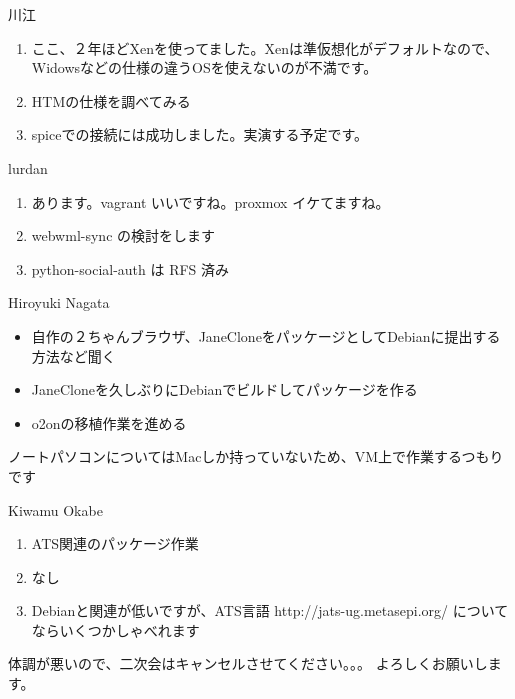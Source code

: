 \documentclass[mingoth,a4paper]{jsarticle}
\begin{document}
\begin{prework}{ 川江 }

 \begin{enumerate}
  \item ここ、２年ほどXenを使ってました。Xenは準仮想化がデフォルトなので、Widowsなどの仕様の違うOSを使えないのが不満です。
  \item HTMの仕様を調べてみる
  \item spiceでの接続には成功しました。実演する予定です。
 \end{enumerate}

\end{prework}

\begin{prework}{ lurdan }

 \begin{enumerate}
  \item あります。vagrant いいですね。proxmox イケてますね。
  \item webwml-sync の検討をします
  \item python-social-auth は RFS 済み
 \end{enumerate}

\end{prework}

\begin{prework}{ Hiroyuki Nagata }

 \begin{itemize}
  \item 自作の２ちゃんブラウザ、JaneCloneをパッケージとしてDebianに提出する方法など聞く
  \item JaneCloneを久しぶりにDebianでビルドしてパッケージを作る
  \item o2onの移植作業を進める
 \end{itemize}

 ノートパソコンについてはMacしか持っていないため、VM上で作業するつもりです

\end{prework}

\begin{prework}{ Kiwamu Okabe }

 \begin{enumerate}
  \item ATS関連のパッケージ作業
  \item なし
  \item Debianと関連が低いですが、ATS言語 http://jats-ug.metasepi.org/ についてならいくつかしゃべれます
 \end{enumerate}

体調が悪いので、二次会はキャンセルさせてください。。。
よろしくお願いします。
\end{prework}
\end{document}
